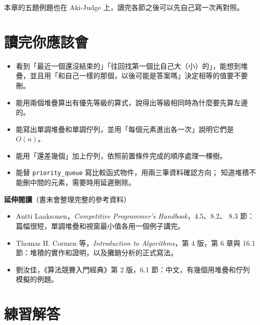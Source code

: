 本章的五題例題也在 Aki-Judge 上，讀完各節之後可以先自己寫一次再對照。

\section{讀完你應該會}
\label{sec:ch6-checklist}

\begin{itemize}
\item 看到「最近一個還沒結束的」「往回找第一個比自己大（小）的」，能想到堆
疊，並且用「和自己一樣的那個，以後可能是答案嗎」決定相等的值要不要刪。
\item 能用兩個堆疊算出有優先等級的算式，說得出等級相同時為什麼要先算左邊的。
\item 能寫出單調堆疊和單調佇列，並用「每個元素進出各一次」說明它們是
$O(n)$。
\item 能用「還差幾個」加上佇列，依照前置條件完成的順序處理一棵樹。
\item 能替 \texttt{priority\_queue} 寫比較函式物件，用兩三筆資料確認方向；
知道堆積不能刪中間的元素，需要時用延遲刪除。
\end{itemize}

\textbf{延伸閱讀}（書末會整理完整的參考資料）

\begin{itemize}
\item Antti Laaksonen，\textit{Competitive Programmer's Handbook}，4.5、8.2、
8.3 節：篇幅很短，單調堆疊和視窗最小值各用一個例子講完。
\item Thomas H. Cormen 等，\textit{Introduction to Algorithms}，第 4 版，第 6
章與 16.1 節：堆積的實作和證明，以及攤銷分析的正式寫法。
\item 劉汝佳，《算法競賽入門經典》第 2 版，6.1 節：中文，有幾個用堆疊和佇列
模擬的例題。
\end{itemize}

\section*{練習解答}

